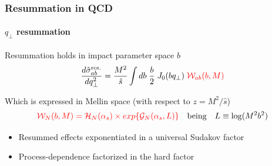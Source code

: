 \documentclass[aspectratio=43]{beamer}
\begin{document}
\begin{frame}

	\frametitle{Resummation in QCD}
	\framesubtitle{$q_{\perp}$ resummation}
	
	Resummation holds in impact parameter space $b$
	\begin{equation}
		\frac{d\hat{\sigma}_{ab}^{\textrm{res.}}}{dq_{\perp}^{2}} = \frac{M^{2}}{\hat{s}} \int db \; \frac{b}{2} \; J_{0}(b q_{\perp}) \; {\color{red} \mathcal{W}_{ab}(b, M)} \nonumber
	\end{equation}
	
	Which is expressed in Mellin space (with respect to $z = M^{2}/\hat{s}$)
	\begin{equation}
		{\color{red} \mathcal{W}_{N}(b, M) = \mathcal{H}_{N}(\alpha_{s}) \times exp\{\mathcal{G}_{N}(\alpha_{s}, L)\}} \quad\textrm{being}\quad L \equiv \log(M^{2}b^{2}) \nonumber
	\end{equation}

	\begin{itemize}
		\item Resummed effects exponentiated in a universal Sudakov factor
		\item Process-dependence factorized in the hard factor
	\end{itemize}

	
\end{frame}

\begin{frame}


\end{frame}
\end{document}
